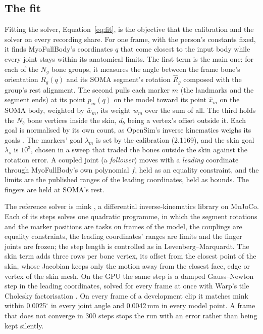 \documentclass[11pt]{article}
\newcommand{\dg}{\ensuremath{^\circ}}
\begin{document}
\subsection{The fit}
\label{sec:fit}

Fitting the solver, Equation~\eqref{eq:fit}, is the objective that the calibration and the solver on every recording
share. For one frame, with the person's constants fixed, it finds MyoFullBody's coordinates $q$
that come closest to the input body while every joint stays within its anatomical limits.
The first term is the main one: for each of the $N_g$ bone groups, it measures the angle between the frame bone's
orientation $R_g(q)$ and its SOMA segment's rotation $\hat R_g$ composed with the group's rest alignment. The second
pulls each marker $m$ (the landmarks and the segment ends) at its point $p_m(q)$ on the model toward its point $\hat
x_m$ on the SOMA body, weighted by $\bar w_m$, its weight $w_m$ over the sum of all. The third holds the $N_b$ bone
vertices inside the skin, $d_b$ being a vertex's offset outside it. Each goal is normalised by its own count, as OpenSim's inverse kinematics weighs its goals
\cite{seth2018opensim}. The markers' goal $\lambda_m$ is set by the calibration (2.1169), and the skin goal
$\lambda_s$ is $10^3$, chosen in a sweep that traded the bones outside the skin against the rotation error. A coupled
joint (a \emph{follower}) moves with a \emph{leading} coordinate through MyoFullBody's own polynomial $f$, held as an
equality constraint, and the limits are the published ranges of the leading coordinates, held as bounds. The fingers
are held at SOMA's rest.

The reference solver is mink \cite{mink}, a differential inverse-kinematics library on MuJoCo. Each of its steps
solves one quadratic programme, in which the segment rotations and the marker positions are tasks on frames of the
model, the couplings are equality constraints, the leading coordinates' ranges are limits and the finger joints are
frozen; the step length is controlled as in Levenberg--Marquardt. The skin term adds three rows per bone vertex, its
offset from the closest point of the skin, whose Jacobian keeps only the motion away from the closest face, edge or
vertex of the skin mesh. On the GPU the same step is a damped Gauss--Newton step in the leading coordinates, solved for
every frame at once with Warp's tile Cholesky factorisation \cite{warp}. On every frame of a development clip it
matches mink within 0.0025\dg{} in every joint angle and 0.0042\,mm in every model point. A frame that does not
converge in 300 steps stops the run with an error rather than being kept silently.
\end{document}

